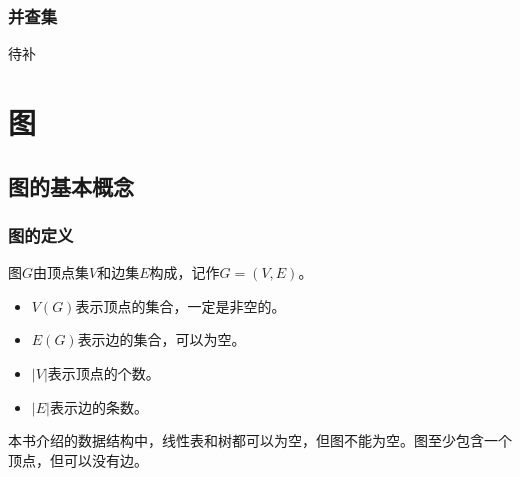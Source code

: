 \documentclass[12pt, a4paper, oneside]{ctexart}
\begin{document}
\subsubsection{并查集}

待补

\section{图}

\subsection{图的基本概念}

\subsubsection{图的定义}

图$G$由顶点集$V$和边集$E$构成，记作$G=(V,E)$。
\begin{itemize}
  \item $V(G)$表示顶点的集合，一定是非空的。
  \item $E(G)$表示边的集合，可以为空。
  \item $\lvert V\rvert$表示顶点的个数。
  \item $\lvert E\rvert$表示边的条数。
\end{itemize}

本书介绍的数据结构中，线性表和树都可以为空，但图不能为空。图至少包含一个顶点，但可以没有边。
\end{document}
